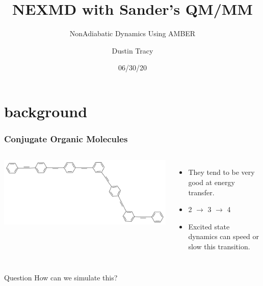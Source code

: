 \documentclass{beamer}
\title{NEXMD with Sander's QM/MM}
\subtitle{NonAdiabatic Dynamics Using AMBER}
\author{Dustin Tracy}
\institute{University of Florida}
\date{06/30/20}
\begin{document}
\begin{frame}
  \titlepage
\end{frame}

\section{background}
\begin{frame}
  \frametitle{Conjugate Organic Molecules}
\begin{columns}[c]
  \includegraphics[width=\textwidth]{Images/com}
  \begin{itemize}
    \item They tend to be very good at energy transfer.
    \item 2 $\rightarrow$ 3 $\rightarrow$ 4
    \item Excited state dynamics can speed or slow this transition.
  \end{itemize}
\end{columns}
\begin{block}{Question}
  How can we simulate this?
\end{block}
\end{frame}
\end{document}
